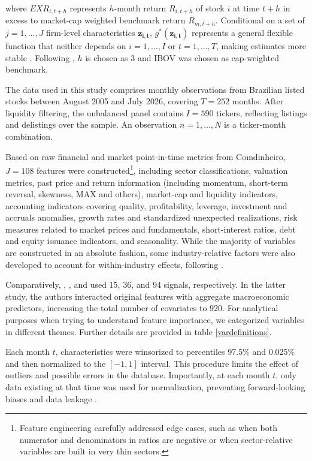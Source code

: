 \documentclass[preprint,12pt,authoryear]{elsarticle}
\begin{document}
where $EXR_{i,t+h}$ represents $h$-month return $R_{i,t+h}$ of stock $i$ at time $t+h$ in excess to market-cap weighted benchmark return $R_{m,t+h}$. Conditional on a set of $j = 1, \ldots, J$ firm-level characteristics $\mathbf{z_{i,t}}$, $g^{*}(\mathbf{z_{i,t}})$ represents a general flexible function that neither depends on $i = 1, \ldots, I$ or $t = 1, \ldots, T$, making estimates more stable \citep{deprado2018}. Following \citet{blitzetal2023}, $h$ is chosen as 3 and IBOV was chosen as cap-weighted benchmark.

The data used in this study comprises monthly observations from Brazilian listed stocks between August 2005 and July 2026, covering $T = 252$ months. After liquidity filtering, the unbalanced panel contains $I = 590$ tickers, reflecting listings and delistings over the sample. An observation $n = 1, \ldots, N$ is a ticker-month combination.

Based on raw financial and market point-in-time metrics from Comdinheiro, $J = 108$ features were constructed\footnote{Feature engineering carefully addressed edge cases, such as when both numerator and denominators in ratios are negative or when sector-relative variables are built in very thin sectors.}, including sector classifications, valuation metrics, past price and return information (including momentum, short-term reversal, skewness, MAX and others), market-cap and liquidity indicators, accounting indicators covering quality, profitability, leverage, investment and accruals anomalies, growth rates and standardized unexpected realizations, risk measures related to market prices and fundamentals, short-interest ratios, debt and equity issuance indicators, and seasonality. While the majority of variables are constructed in an absolute fashion, some industry-relative factors were also developed to account for within-industry effects, following \cite{asnessporterstevens2000}.

Comparatively, \citet{lewellen2015}, \citet{freybergerneuhierlweber2020}, and \citet{gukellyxiu2020} used 15, 36, and 94 signals, respectively. In the latter study, the authors interacted original features with aggregate macroeconomic predictors, increasing the total number of covariates to 920. For analytical purposes when trying to understand feature importance, we categorized variables in different themes. Further details are provided in table \ref{vardefinitions}.

Each month $t$, characteristics were winsorized to percentiles 97.5\% and 0.025\% and then normalized to the $[-1,1]$ interval. This procedure limits the effect of outliers and possible errors in the database. Importantly, at each month $t$, only data existing at that time was used for normalization, preventing forward-looking biases and data leakage \citep{coqueretguida2020, gukellyxiu2020, hanauerkalsbach2023}.
\end{document}
